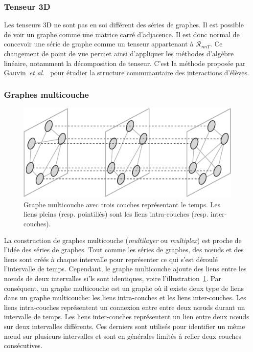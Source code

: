 \subsubsection{Tenseur 3D}
Les tenseurs 3D ne sont pas en soi différent des séries de graphes.
Il est possible de voir un graphe comme une matrice carré d'adjacence.
Il est donc normal de concevoir une série de graphe comme un tenseur appartenant à $\mathcal{R}_{nnT}$.
Ce changement de point de vue permet ainsi d'appliquer les méthodes d'algèbre linéaire, notamment la décomposition de tenseur.
C'est la méthode proposée par Gauvin~\emph{et al.}~\cite{Gauvin2014} pour étudier la structure communautaire des interactions d'élèves.



\subsubsection{Graphes multicouche}
\begin{figure}[h]
\centering
\includegraphics[width=0.7\linewidth]{img/Intro/multiplex.eps}
\caption{Graphe multicouche avec trois couches représentant le temps.
Les liens pleins (resp. pointillés) sont les liens intra-couches (resp. inter-couches).}
\label{fig:exemple_multiplex}
\end{figure}
La construction de graphes multicouche (\emph{multilayer} ou \emph{multiplex}) est proche de l'idée des séries de graphes.
Tout comme les séries de graphes, des n\oe uds et des liens sont créés à chaque intervalle pour représenter ce qui s'est déroulé l'intervalle de temps.
Cependant, le graphe multicouche ajoute des liens entre les n\oe uds de deux intervalles si'ls sont identiques, voire l'illustration~\ref{fig:exemple_multiplex}.
Par conséquent, un graphe multicouche est un graphe où il existe deux type de liens dans un graphe multicouche: les liens intra-couches et les liens inter-couches.
Les liens intra-couches représentent un connexion entre entre deux n\oe uds durant un intervalle de temps.
Les liens inter-couches représentent un lien entre deux n\oe uds sur deux intervalles différents.
Ces derniers sont utilisés pour identifier un même n\oe ud sur plusieurs intervalles et sont en générales limités à relier deux couches consécutives.

